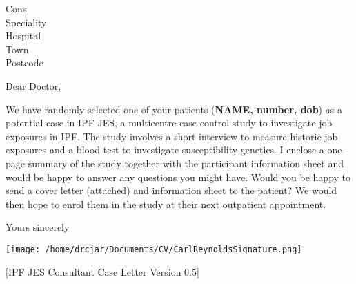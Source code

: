 \documentclass[imperial,letterpaper,pagesize,UScommercial9]{scrlttr2}
\begin{document}
\begin{letter}{Cons \\ Speciality \\ Hospital \\ Town \\ Postcode}


\opening{Dear Doctor,}

    We have randomly selected one of your patients (\textbf{NAME, number, dob}) as a potential case in IPF JES, a multicentre case-control study to investigate job exposures in IPF.
    The study involves a short interview to measure historic job exposures and a blood test to investigate susceptibility genetics. I enclose a one-page summary of the study together with the participant information sheet and would be happy to answer any questions you might have.
    Would you be happy to send a cover letter (attached) and information sheet to the patient? We would then hope to enrol them in the study at their next outpatient appointment.



\closing{Yours sincerely}

    \texttt{[image: /home/drcjar/Documents/CV/CarlReynoldsSignature.png]}

     \vfill \hfill [IPF JES Consultant Case Letter Version 0.5]

\end{letter}
\end{document}
